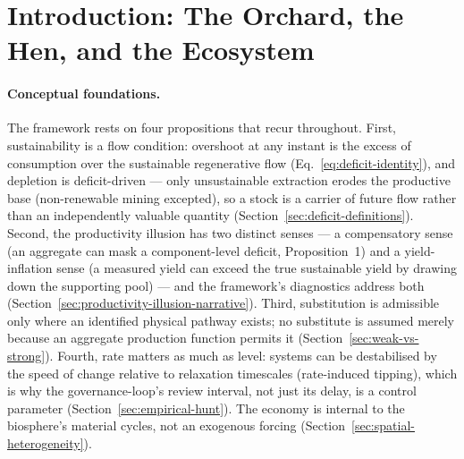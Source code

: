 \documentclass[twocolumn,10pt]{article}
\begin{document}
\begin{abstract}
resource's relaxation timescale --- but they are distinct; we use the former, more precise label. Delay-amplified instability thus spans two regimes: a near-term stabilising transition whose threshold falls within documented governance lags, and a longer-horizon, more speculative tipping phenomenon.

By moving beyond static vector accounting and introducing nonlinear feedback loops, this framework demonstrates that component-specific thresholds cannot be bypassed by aggregation. Furthermore, it reveals that institutional pacing is a primary determinant of ecological stability, where a delay of roughly a decade promotes long-term equilibrium, while hyper-reactive scarcity responses trigger systemic volatility. The exact SNPO pinning of the upper-window folds and whether the pattern persists in the full framework remain open questions; the $\eta=10$ recurring intermittency has been classified as homoclinic-like slow-fast (relaxation) intermittency rather than a torus.
\end{abstract}

\section{Introduction: The Orchard, the Hen, and the Ecosystem}
\label{sec:introduction}

\paragraph{Conceptual foundations.} The framework rests on four propositions that recur throughout. First, sustainability is a flow condition: overshoot at any instant is the excess of consumption over the sustainable regenerative flow (Eq.~\eqref{eq:deficit-identity}), and depletion is deficit-driven --- only unsustainable extraction erodes the productive base (non-renewable mining excepted), so a stock is a carrier of future flow rather than an independently valuable quantity (Section~\ref{sec:deficit-definitions}). Second, the productivity illusion has two distinct senses --- a compensatory sense (an aggregate can mask a component-level deficit, Proposition~1) and a yield-inflation sense (a measured yield can exceed the true sustainable yield by drawing down the supporting pool) --- and the framework's diagnostics address both (Section~\ref{sec:productivity-illusion-narrative}). Third, substitution is admissible only where an identified physical pathway exists; no substitute is assumed merely because an aggregate production function permits it (Section~\ref{sec:weak-vs-strong}). Fourth, rate matters as much as level: systems can be destabilised by the speed of change relative to relaxation timescales (rate-induced tipping), which is why the governance-loop's review interval, not just its delay, is a control parameter (Section~\ref{sec:empirical-hunt}). The economy is internal to the biosphere's material cycles, not an exogenous forcing (Section~\ref{sec:spatial-heterogeneity}).
\end{document}
